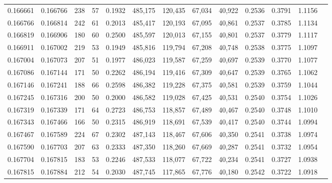 \begin{tabular}{rrrrrrrrrrrrr}
0.166661 & 0.166766 &   238 &  57 &                                     0.1932 & 485,175 & 120,435 &  67,034 &  40,922 & 0.2536 & 0.3791 & 1.1156 \\
0.166766 & 0.166814 &   242 &  61 &                                     0.2013 & 485,417 & 120,193 &  67,095 &  40,861 & 0.2537 & 0.3785 & 1.1134 \\
0.166819 & 0.166906 &   180 &  60 &                                     0.2500 & 485,597 & 120,013 &  67,155 &  40,801 & 0.2537 & 0.3779 & 1.1117 \\
0.166911 & 0.167002 &   219 &  53 &                                     0.1949 & 485,816 & 119,794 &  67,208 &  40,748 & 0.2538 & 0.3775 & 1.1097 \\
0.167004 & 0.167073 &   207 &  51 &                                     0.1977 & 486,023 & 119,587 &  67,259 &  40,697 & 0.2539 & 0.3770 & 1.1077 \\
0.167086 & 0.167144 &   171 &  50 &                                     0.2262 & 486,194 & 119,416 &  67,309 &  40,647 & 0.2539 & 0.3765 & 1.1062 \\
0.167146 & 0.167241 &   188 &  66 &                                     0.2598 & 486,382 & 119,228 &  67,375 &  40,581 & 0.2539 & 0.3759 & 1.1044 \\
0.167245 & 0.167316 &   200 &  50 &                                     0.2000 & 486,582 & 119,028 &  67,425 &  40,531 & 0.2540 & 0.3754 & 1.1026 \\
0.167319 & 0.167339 &   171 &  64 &                                     0.2723 & 486,753 & 118,857 &  67,489 &  40,467 & 0.2540 & 0.3748 & 1.1010 \\
0.167343 & 0.167466 &   166 &  50 &                                     0.2315 & 486,919 & 118,691 &  67,539 &  40,417 & 0.2540 & 0.3744 & 1.0994 \\
0.167467 & 0.167589 &   224 &  67 &                                     0.2302 & 487,143 & 118,467 &  67,606 &  40,350 & 0.2541 & 0.3738 & 1.0974 \\
0.167590 & 0.167703 &   207 &  63 &                                     0.2333 & 487,350 & 118,260 &  67,669 &  40,287 & 0.2541 & 0.3732 & 1.0954 \\
0.167704 & 0.167815 &   183 &  53 &                                     0.2246 & 487,533 & 118,077 &  67,722 &  40,234 & 0.2541 & 0.3727 & 1.0938 \\
0.167815 & 0.167884 &   212 &  54 &                                     0.2030 & 487,745 & 117,865 &  67,776 &  40,180 & 0.2542 & 0.3722 & 1.0918 \\

\end{tabular}
